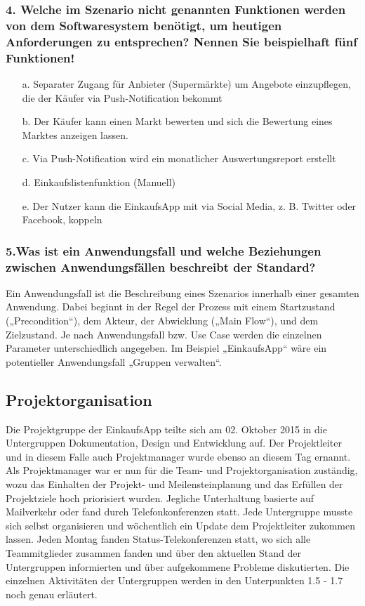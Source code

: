 \documentclass[12pt,a4paper]{article}
\begin{document}
\subsubsection*{4. Welche im Szenario nicht genannten Funktionen werden von dem Softwaresystem benötigt, um heutigen Anforderungen zu entsprechen? Nennen Sie beispielhaft fünf Funktionen!}
\begin{itemize}
\item[a.] Separater Zugang für Anbieter (Supermärkte) um Angebote einzupflegen, die der Käufer via Push-Notification bekommt
\item[b.] Der Käufer kann einen Markt bewerten und sich die Bewertung eines Marktes anzeigen lassen.
\item[c.] Via Push-Notification wird ein monatlicher Auswertungsreport erstellt
\item[d.] Einkaufslistenfunktion (Manuell)
\item[e.] Der Nutzer kann die EinkaufsApp mit via Social Media, z. B. Twitter oder Facebook, koppeln
\end{itemize}
 
 
\subsubsection*{5.Was ist ein Anwendungsfall und welche Beziehungen zwischen Anwendungsfällen beschreibt der Standard?}

Ein Anwendungsfall ist die Beschreibung eines Szenarios innerhalb einer gesamten Anwendung. Dabei beginnt in der Regel der Prozess mit einem Startzustand („Precondition“), dem Akteur, der Abwicklung („Main Flow“), und dem Zielzustand. Je nach Anwendungsfall bzw. Use Case werden die einzelnen Parameter unterschiedlich angegeben. 
Im Beispiel „EinkaufsApp“ wäre ein potentieller Anwendungsfall „Gruppen verwalten“. 


\newpage
\subsection{Projektorganisation}
Die Projektgruppe der EinkaufsApp teilte sich am 02. Oktober 2015 in die Untergruppen Dokumentation, Design und Entwicklung auf.
Der Projektleiter und in diesem Falle auch Projektmanager wurde ebenso an diesem Tag ernannt.
Als Projektmanager war er nun für die Team- und Projektorganisation zuständig, wozu das Einhalten der Projekt- und Meilensteinplanung  und das Erfüllen der Projektziele hoch priorisiert wurden.
Jegliche Unterhaltung basierte auf Mailverkehr oder fand durch Telefonkonferenzen statt. Jede Untergruppe musste sich selbst organisieren und wöchentlich ein Update dem Projektleiter zukommen lassen. Jeden Montag fanden Status-Telekonferenzen statt, wo sich alle Teammitglieder zusammen fanden und über den aktuellen Stand der Untergruppen informierten und über aufgekommene Probleme diskutierten. Die einzelnen Aktivitäten der Untergruppen werden in den Unterpunkten  1.5 - 1.7 noch genau erläutert.
\end{document}
